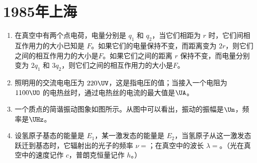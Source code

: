 \documentclass[\gkver]{gaokaozhenti}
\begin{document}
\chapter{1985年上海}

\begin{enumerate}
\item
在真空中有两个点电荷，电量分别是 $q_{1}$ 和 $q_{2}$，当它们相距为 $r$ 时，它们间相互作用力的大小已知是 $F$。如果它们的电量保持不变，而距离变为 $2r$，则它们之间的相互作用力的大小是$F$。如果它们之间的距离 $r$ 保持不变，而电量分别变为 $2q_{1}$ 和 $3q_{2}$，则它们之间的相互作用力的大小是$F$。



\item
照明用的交流电电压为 $220\UV$，这是指电压的值；当接入一个电阻为 $1100\UO$ 的电热丝时，通过电热丝的电流的最大值是$\UA$。



\item
一个质点的简谐振动图象如图所示。从图中可以看出，振动的振幅是$\Um$，频率是$\UHz$。
\onepicture[align=right, w=6.12cm]{}



\item
设氢原子基态的能量是 $E_{1}$，某一激发态的能量是 $E_{2}$，当氢原子从这一激发态跃迁到基态时，它辐射出的光子的频率 $\nu =$；在真空中的波长 $\lambda =$。（光在真空中的速度记作 $c$，普朗克恒量记作 $h$。）


\end{enumerate}
\end{document}
